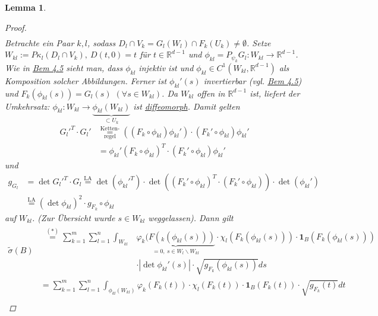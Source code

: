 \documentclass[a4paper]{scrreprt}
\newcommand{\doubleOne}{\textbf{1}}
\newcommand{\R}{\mathbb{R}}
\newcommand{\overunderset}[3]{\overset{#1}{\underset{#3}{#2}}}
\newcommand{\jhyperref}[2]{\hyperref[j_#1]{#2}}
\newcommand{\jlink}[1]{\jhyperref{#1}{#1}}
\newcommand{\jabb}[3]{ #1: #2 \rightarrow #3 }
\theoremstyle{plain}
\newtheorem{lem}[thm]{Lemma}
\theoremstyle{definition}
\begin{document}
{{{{\begin{lem}
\begin{proof}
\[\begin{split}
            \end{split}
        \]
        Betrachte ein Paar $k,l$, sodass $D_l\cap V_k = G_l(W_l)\cap F_k(U_k) \ne \emptyset$. Setze $W_{kl}:= P\kappa_l(D_l\cap V_k), \ D(t,0) = t$ für $t\in\R^{d-1}$ und $\phi_{kl} = \jabb{P_{\psi_k}G_l}{W_{kl}}{\R^{d-1}}$. Wie in \jlink{Bem 4.5} sieht man, dass $\phi_{kl}$ injektiv ist und $\phi_{kl}\in C^1(W_{kl}, \R^{d-1})$ als Komposition solcher Abbildungen. Ferner ist $\phi_{kl}'(s)$ invertierbar (vgl. \jlink{Bem 4.5}) und $F_k(\phi_{kl}(s)) = G_l(s)$ $(\forall s \in W_{kl})$. Da $W_{kl}$ offen in $\R^{d-1}$ ist, liefert der Umkehrsatz: $\jabb{\phi_{kl}}{W_{kl}}{\underbrace{\phi_{kl}(W_{kl})}_{\subset U_k}}$ ist \jlink{diffeomorph}. Damit gelten
        \[
            \begin{split}
                G_l'^T \cdot G_l' &\overunderset{\text{Ketten-}}{=}{\text{regel}} \left((F_k \circ \phi_{kl}) \phi_{kl}' \right) \cdot (F_k' \circ \phi_{kl}) \phi_{kl}'\\
                                  &=\phi_{kl}' (F_k\circ \phi_{kl})^T\cdot (F_k' \circ \phi_{kl}) \phi_{kl}'
            \end{split}
        \]
        und
        \[
            \begin{split}
                g_{G_l} &= \det G_l'^T \cdot G_l \overset{\text{LA}}{=} \det (\phi_{kl}'^T)\cdot \det \left((F_k' \circ \phi_{kl})^T \cdot (F_k' \circ \phi_{kl}) \right) \cdot \det(\phi_{kl}')\\
                        &\overset{\text{LA}}{=} \left(\det \phi_{kl} \right)^2 \cdot g_{F_k}\circ \phi_{kl}
            \end{split}
        \]
        auf $W_{kl}$. (Zur Übersicht wurde $s\in W_{kl}$ weggelassen). Dann gilt
        \[
            \begin{split}
                \tilde{\sigma}(B)
                &\begin{split}
                    \overset{(*)}{=}\sum_{k=1}^m \sum_{l=1}^n \int_{W_{kl}}&\underbrace{\varphi_k(F(_k(\phi_{kl}(s)))}_{=0,\ s\in W_l\backslash W_{kl}} \cdot \chi_l(F_k(\phi_{kl}(s))) \cdot \doubleOne_B(F_k(\phi_{kl}(s)))\\
                &\cdot |\det \phi_{kl}'(s)| \cdot \sqrt{g_{F_k}(\phi_{kl}(s))} ds 
                \end{split}\\
                &= \sum_{k=1}^m \sum_{l=1}^n \int_{\phi_{kl}(W_{kl})} \varphi_k(F_k(t)) \cdot \chi_l(F_k(t)) \cdot \doubleOne_B(F_k(t)) \cdot \sqrt{g_{F_k}(t)} dt\\

\end{split}\]
\end{proof}
\end{lem}}}}}
\end{document}
